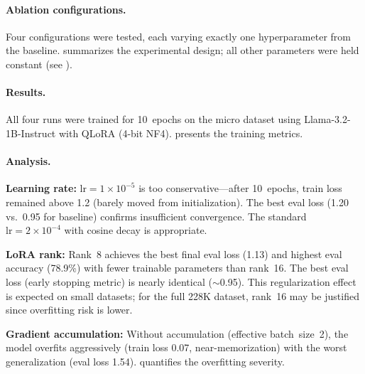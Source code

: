 \paragraph{Ablation configurations.}
Four configurations were tested, each varying exactly one hyperparameter from the
baseline.  summarizes the experimental design; all other
parameters were held constant (see ).

\begin{table}[htbp]
\centering
\caption{Ablation study configurations. Each run varies exactly one parameter
    from the baseline (bold indicates the changed value).}
\label{tab:ablation_configs}

\end{table}

\paragraph{Results.}
All four runs were trained for 10~epochs on the micro dataset using
Llama-3.2-1B-Instruct with QLoRA (4-bit NF4).  presents
the training metrics.

\begin{table}[htbp]
\centering
\caption{Ablation study results (Llama-3.2-1B, 800 samples, 10 epochs).
    Bold indicates best value per column.}
\label{tab:ablation_results}

\end{table}

\paragraph{Analysis.}
\textbf{Learning rate:} $\text{lr} = 1 \times 10^{-5}$ is too conservative---after
10~epochs, train loss remained above 1.2 (barely moved from initialization). The best
eval loss (1.20 vs.\ 0.95 for baseline) confirms insufficient convergence. The standard
$\text{lr} = 2 \times 10^{-4}$ with cosine decay is appropriate.

\textbf{LoRA rank:} Rank~8 achieves the best final eval loss (1.13) and highest eval
accuracy (78.9\%) with fewer trainable parameters than rank~16. The best eval loss
(early stopping metric) is nearly identical ($\sim$0.95). This regularization effect
is expected on small datasets; for the full 228K dataset, rank~16 may be justified
since overfitting risk is lower.

\textbf{Gradient accumulation:} Without accumulation (effective batch~size~2), the model
overfits aggressively (train loss 0.07, near-memorization) with the worst generalization
(eval loss 1.54).  quantifies the overfitting severity.

